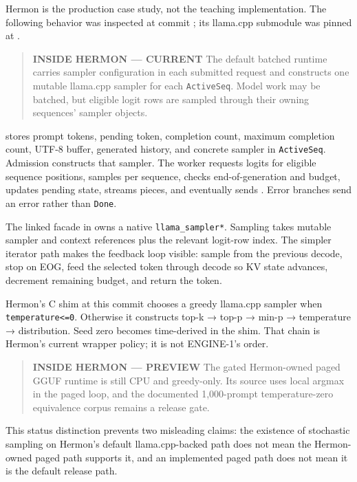 Hermon is the production case study, not the teaching implementation.
The following behavior was inspected at commit
\texttt{}; its
llama.cpp submodule was pinned at
\texttt{}.

\begin{quote}
\textbf{INSIDE HERMON --- CURRENT} The default batched runtime carries
sampler configuration in each submitted request and constructs one
mutable llama.cpp sampler for each \texttt{ActiveSeq}. Model work may be
batched, but eligible logit rows are sampled through their owning
sequences' sampler objects.
\end{quote}

\texttt{} stores prompt
tokens, pending token, completion count, maximum completion count, UTF-8
buffer, generated history, and concrete sampler in \texttt{ActiveSeq}.
Admission constructs that sampler. The worker requests logits for
eligible sequence positions, samples per sequence, checks
end-of-generation and budget, updates pending state, streams pieces, and
eventually sends \texttt{}.
Error branches send an error rather than \texttt{Done}.

The linked facade in
\texttt{} owns a native
\texttt{llama\_sampler*}. Sampling takes mutable sampler and context
references plus the relevant logit-row index. The simpler iterator path
makes the feedback loop visible: sample from the previous decode, stop
on EOG, feed the selected token through decode so KV state advances,
decrement remaining budget, and return the token.

Hermon's C shim at this commit chooses a greedy llama.cpp sampler when
\texttt{temperature\textless{}=0}. Otherwise it constructs top-k → top-p
→ min-p → temperature → distribution. Seed zero becomes time-derived in
the shim. That chain is Hermon's current wrapper policy; it is not
ENGINE-1's order.

\begin{quote}
\textbf{INSIDE HERMON --- PREVIEW} The gated Hermon-owned paged GGUF
runtime is still CPU and greedy-only. Its source uses local argmax in
the paged loop, and the documented 1,000-prompt temperature-zero
equivalence corpus remains a release gate.
\end{quote}

This status distinction prevents two misleading claims: the existence of
stochastic sampling on Hermon's default llama.cpp-backed path does not
mean the Hermon-owned paged path supports it, and an implemented paged
path does not mean it is the default release path.

